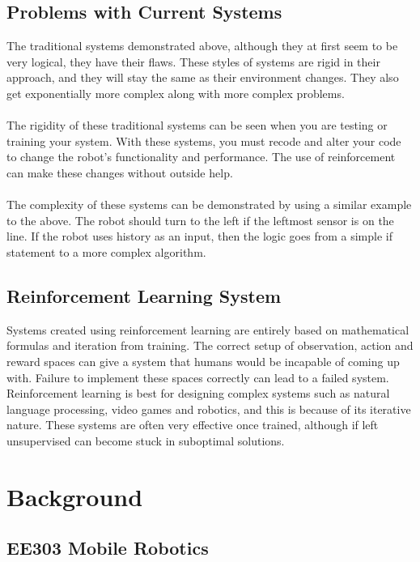 \documentclass[12pt]{article}
\begin{document}
\subsection{Problems with Current Systems}

The traditional systems demonstrated above, although they at first seem to be very logical, they have their flaws. These styles of systems are rigid in their approach, and they will stay the same as their environment changes. They also get exponentially more complex along with more complex problems.
\\\\
The rigidity of these traditional systems can be seen when you are testing or training your system. With these systems, you must recode and alter your code to change the robot's functionality and performance. The use of reinforcement can make these changes without outside help.
\\\\
The complexity of these systems can be demonstrated by using a similar example to the above. The robot should turn to the left if the leftmost sensor is on the line. If the robot uses history as an input, then the logic goes from a simple if statement to a more complex algorithm.


\subsection{Reinforcement Learning System}

Systems created using reinforcement learning are entirely based on mathematical formulas and iteration from training. The correct setup of observation, action and reward spaces can give a system that humans would be incapable of coming up with. Failure to implement these spaces correctly can lead to a failed system. Reinforcement learning is best for designing complex systems such as natural language processing, video games and robotics, and this is because of its iterative nature. These systems are often very effective once trained, although if left unsupervised can become stuck in suboptimal solutions.

\section{Background}
\subsection{EE303 Mobile Robotics}
\end{document}
